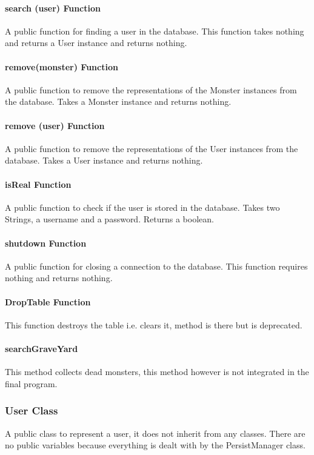 \documentclass[titlepage]{article}
\begin{document}
\paragraph{search (user) Function}
A public function for finding a user in the database. This function takes nothing and returns a User instance and returns nothing.

\paragraph{remove(monster) Function}
A public function to remove the representations of the Monster instances from the database. Takes a Monster instance and returns nothing.

\paragraph{remove (user) Function}
A public function to remove the representations of the User instances from the database. Takes a User instance and returns nothing.

\paragraph{isReal Function}
A public function to check if the user is stored in the database. Takes two Strings, a username and a password. Returns a boolean.

\paragraph{shutdown Function}
A public function for closing a connection to the database. This function requires nothing and returns nothing.

\paragraph {DropTable Function}
This function destroys the table i.e. clears it, method is there but is deprecated. 

\paragraph {searchGraveYard}
This method collects dead monsters, this method however is not integrated in the final program.

\subsubsection{User Class}
A public class to represent a user, it does not inherit from any classes. There are no public variables because everything is dealt with by the PersistManager class.
\end{document}
